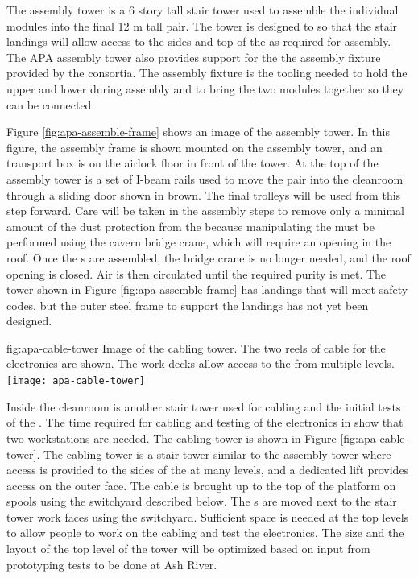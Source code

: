 
The  assembly tower is a 6 story tall stair tower used to assemble the individual  modules into the final 12 \si{m} tall pair. 
The tower is designed to so that the stair landings will allow access to the sides and top of the  as required for assembly. 
The APA assembly tower also provides support for the the  assembly fixture provided by the  consortia. 
The  assembly fixture is the tooling needed to hold the upper and lower  during assembly and to bring the two modules together so they can be connected. 

Figure \ref{fig:apa-assemble-frame} shows an image of the  assembly tower. 
In this figure, the  assembly frame is shown mounted on the assembly tower, and an  transport box is on the airlock floor in front of the tower. 
At the top of the  assembly tower is a set of I-beam rails used to move the  pair into the cleanroom through a sliding door shown in brown. 
The final trolleys will be used from this step forward. 
Care will be taken in the  assembly steps to remove only a minimal amount of the dust protection from the  because manipulating the  must be performed using the cavern bridge crane, which will require an opening in the roof. 
Once the s are assembled, the bridge crane is no longer needed, and the roof opening is closed. Air is then circulated until the required purity is met. The tower shown in Figure \ref{fig:apa-assemble-frame} has landings that will meet safety codes, but the outer steel frame to support the landings has not yet been designed.


\begin{dunefigure}{fig:apa-cable-tower}
  {Image of the  cabling tower. The two reels of cable for the electronics are shown. The work decks allow access to the  from multiple levels. }
\texttt{[image: apa-cable-tower]}
\end{dunefigure}

Inside the cleanroom is another stair tower used for cabling and the initial tests of the . The time required for cabling and testing of the electronics in  show that two workstations are needed. The  cabling tower is shown in Figure \ref{fig:apa-cable-tower}. The  cabling tower is a stair tower similar to the  assembly tower where access is provided to the sides of the  at many levels, and a dedicated lift provides access on the outer face. The cable is brought up to the top of the platform on spools using the switchyard described below. The s are moved next to the stair tower work faces using the switchyard.  Sufficient space is needed at the top levels to allow people to work on the cabling and test the electronics. The size and the layout of the top level of the tower will be optimized based on input from prototyping tests to be done at Ash River. 

